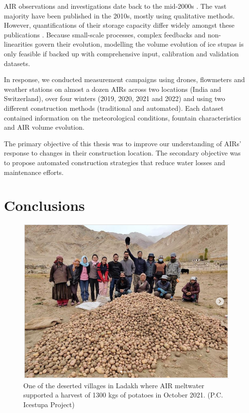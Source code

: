 AIR observations and investigations date back to the mid-2000s \citep{tveitenGlacierGrowingLocal2007}. The vast
majority have been published in the 2010s, mostly using qualitative methods. However, quantifications of their
storage capacity differ widely amongst these publications \citep{baglaArtificialGlaciersHelp1998,
norphelSnowWaterHarvesting2015, nusserSociohydrologyArtificialGlaciers2019}. Because small-scale processes,
complex feedbacks and non-linearities govern their evolution, modelling the volume evolution of ice stupas is
only feasible if backed up with comprehensive input, calibration and validation datasets.

In response, we conducted measurement campaigns using drones, flowmeters and weather stations on almost a dozen
AIRs across two locations (India and Switzerland), over four winters (2019, 2020, 2021 and 2022) and using two
different construction methods (traditional and automated). Each dataset contained information on the
meteorological conditions, fountain characteristics and AIR volume evolution. 

The primary objective of this thesis was to improve our understanding of AIRs' response to changes in
their construction location. The secondary objective was to propose automated construction strategies that reduce
water losses and maintenance efforts.  

\section{Conclusions}

\begin{figure}[htb]
	\includegraphics[width=\textwidth]{figs/Kullum_potatoes}
	\caption{One of the deserted villages in Ladakh where AIR meltwater supported a harvest of 1300 kgs of
  potatoes in October 2021. (P.C. Icestupa Project)}
	\label{fig:kullum_potatoes}
\end{figure}


